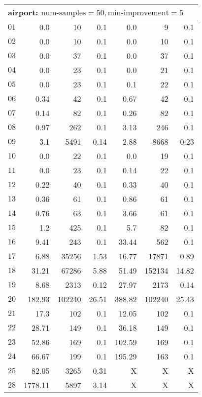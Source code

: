 \begin{longtable}{|c||r|r|r||r|r|r|}
\multicolumn{7}{|l|}{airport: $\text{num-samples}=50,\text{min-improvement}=5$}\\\hline
$01$ & 0.0 & 10 & 0.1 &0.0 & 9 & 0.1 \\\hline
$02$ & 0.0 & 10 & 0.1 &0.0 & 10 & 0.1 \\\hline
$03$ & 0.0 & 37 & 0.1 &0.0 & 37 & 0.1 \\\hline
$04$ & 0.0 & 23 & 0.1 &0.0 & 21 & 0.1 \\\hline
$05$ & 0.0 & 23 & 0.1 &0.1 & 22 & 0.1 \\\hline
$06$ & 0.34 & 42 & 0.1 &0.67 & 42 & 0.1 \\\hline
$07$ & 0.14 & 82 & 0.1 &0.26 & 82 & 0.1 \\\hline
$08$ & 0.97 & 262 & 0.1 &3.13 & 246 & 0.1 \\\hline
$09$ & 3.1 & 5491 & 0.14 &2.88 & 8668 & 0.23 \\\hline
$10$ & 0.0 & 22 & 0.1 &0.0 & 19 & 0.1 \\\hline
$11$ & 0.0 & 23 & 0.1 &0.14 & 22 & 0.1 \\\hline
$12$ & 0.22 & 40 & 0.1 &0.33 & 40 & 0.1 \\\hline
$13$ & 0.36 & 61 & 0.1 &0.86 & 61 & 0.1 \\\hline
$14$ & 0.76 & 63 & 0.1 &3.66 & 61 & 0.1 \\\hline
$15$ & 1.2 & 425 & 0.1 &5.7 & 82 & 0.1 \\\hline
$16$ & 9.41 & 243 & 0.1 &33.44 & 562 & 0.1 \\\hline
$17$ & 6.88 & 35256 & 1.53 &16.77 & 17871 & 0.89 \\\hline
$18$ & 31.21 & 67286 & 5.88 &51.49 & 152134 & 14.82 \\\hline
$19$ & 8.68 & 2313 & 0.12 &27.97 & 2173 & 0.14 \\\hline
$20$ & 182.93 & 102240 & 26.51 &388.82 & 102240 & 25.43 \\\hline
$21$ & 17.3 & 102 & 0.1 &12.05 & 102 & 0.1 \\\hline
$22$ & 28.71 & 149 & 0.1 &36.18 & 149 & 0.1 \\\hline
$23$ & 52.86 & 169 & 0.1 &102.59 & 169 & 0.1 \\\hline
$24$ & 66.67 & 199 & 0.1 &195.29 & 163 & 0.1 \\\hline
$25$ & 82.05 & 3265 & 0.31 &X & X & X \\\hline
$28$ & 1778.11 & 5897 & 3.14 &X & X & X \\\hline

\end{longtable}

